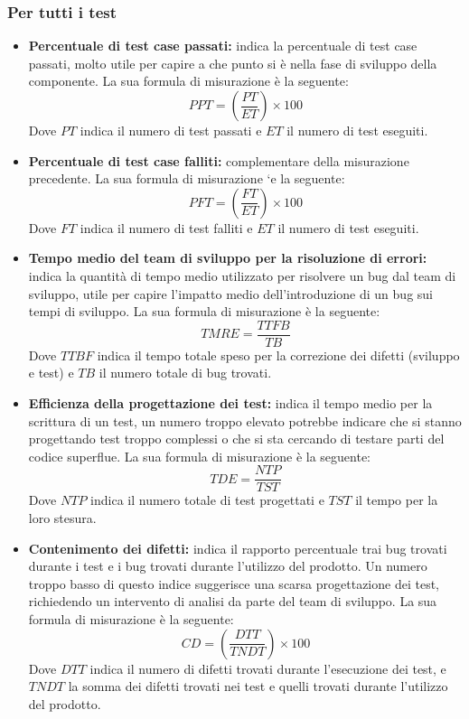 \subsubsection{Per tutti i test}
\begin{itemize}
    \item \textbf{Percentuale di test case passati:} indica la percentuale di test case passati,  molto utile per capire a che punto si è nella fase di sviluppo della componente.  La sua formula di misurazione è la seguente:\newline
    \[
		PPT=(\frac{PT}{ET}) \times 100
	\]	
	Dove $PT$ indica il numero di test passati e $ET$ il numero di test eseguiti.
    \item \textbf{Percentuale di test case falliti:} complementare della misurazione precedente.  La sua formula di misurazione `e la seguente:\newline
    \[
		PFT=(\frac{FT}{ET}) \times 100
	\]	
	Dove $FT$ indica il numero di test falliti e $ET$ il numero di test eseguiti.
    \item \textbf{Tempo medio del team di sviluppo per la risoluzione di errori:} indica  la  quantità  di  tempo  medio  utilizzato  per  risolvere  un  bug dal team di sviluppo,  utile per capire l’impatto medio dell’introduzione di un bug sui tempi di sviluppo.  La sua formula di misurazione è la seguente:\newline
    \[
		TMRE=\frac{TTFB}{TB}
	\]	
	Dove $TTBF$ indica il tempo totale speso per la correzione dei difetti (sviluppo e test) e $TB$ il numero totale di bug trovati.
    \item \textbf{Efficienza  della  progettazione  dei  test:} indica  il  tempo medio per la scrittura di un test, un numero troppo elevato potrebbe indicare che si stanno progettando test troppo complessi o che si sta cercando di  testare  parti  del  codice  superflue.   La  sua  formula  di  misurazione  è  la seguente:\newline
    \[
		TDE=\frac{NTP}{TST}
	\]	
	Dove $NTP$ indica il numero totale di test progettati e $TST$ il tempo per la loro stesura.
    \item \textbf{Contenimento dei difetti:} indica il rapporto percentuale trai bug trovati durante i test e i bug trovati durante l’utilizzo del prodotto.  Un numero  troppo  basso  di  questo  indice  suggerisce  una  scarsa  progettazione dei test, richiedendo un intervento di analisi da parte del team di sviluppo. La sua formula di misurazione è la seguente:\newline
    \[
		CD=(\frac{DTT}{TNDT}) \times 100
	\]	
	Dove $DTT$ indica il numero di difetti trovati durante l’esecuzione dei test, e $TNDT$ la somma dei difetti trovati nei test e quelli trovati durante l’utilizzo del prodotto.


\end{itemize}
